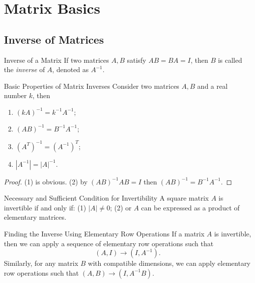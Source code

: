 
\section{Matrix Basics}

\subsection{Inverse of Matrices}

\begin{definition}{Inverse of a Matrix}{}
  If two matrices $A, B$ satisfy $AB = BA = I$,
  then $B$ is called the \emph{inverse} of $A$, denoted as $A^{-1}$.
\end{definition}

\begin{proposition}{Basic Properties of Matrix Inverses}{}
  Consider two matrices $A, B$ and a real number $k$, then
  \begin{enumerate}
  \item $(kA)^{-1} = k^{-1}A^{-1}$;
  \item $(AB)^{-1} = B^{-1} A^{-1}$;
  \item $(A^T)^{-1} = (A^{-1})^T$;
  \item $|A^{-1}| = |A|^{-1}$.
  \end{enumerate}
\end{proposition}

\begin{proof}
  (1) is obvious.
  (2) by $(AB)^{-1}AB = I$ then $(AB)^{-1} = B^{-1}A^{-1}$.
\end{proof}

\begin{proposition}{Necessary and Sufficient Condition for Invertibility}{}
  A square matrix $A$ is invertible if and only if:
  (1) $|A| \neq 0$;
  (2) or $A$ can be expressed as a product of elementary matrices.
\end{proposition}

\begin{proposition}{Finding the Inverse Using Elementary Row Operations}{}
  If a matrix $A$ is invertible, then we can apply a sequence of
  elementary row operations such that
  \begin{equation}
    (A, I) \rightarrow (I, A^{-1}).
  \end{equation}
  Similarly, for any matrix $B$ with compatible dimensions,
  we can apply elementary row operations such that $(A, B)
  \rightarrow (I, A^{-1}B)$.
\end{proposition}

